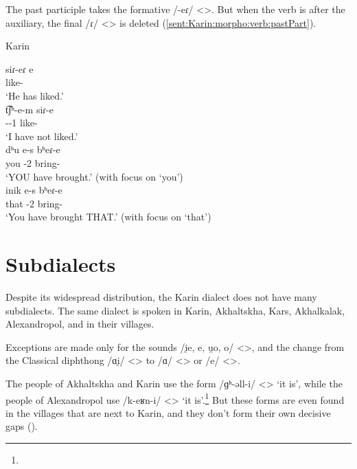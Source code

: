 The past participle takes the formative /-eɾ/ <>. But when the verb is after the auxiliary, the final /ɾ/ <> is deleted (\ref{sent:Karin:morpho:verb:pastPart}). 

\begin{exe}
	\ex Karin \label{sent:Karin:morpho:verb:pastPart}
	\begin{xlist}
		\ex \gll siɾ-eɾ e \\
		like-{\perfcvb} {\aux} \\
		\trans `He has liked.'\\
		\ex \gll t͡ʃʰ-e-m siɾ-e \\
		{\neggloss}-{\aux}-1{\sg} like-{\perfcvb} \\
		\trans `I have not liked.'\\
		\ex \gll dʰu e-s bʰeɾ-e \\
		you {\aux}-2{\sg} bring-{\perfcvb} \\
		\trans `YOU have brought.' (with focus on `you')\\
		\ex \gll inik e-s bʰeɾ-e \\
		that {\aux}-2{\sg} bring-{\perfcvb} \\
		\trans `You have brought THAT.' (with focus on `that')\\
	\end{xlist}
\end{exe}

\section{Subdialects}

Despite its widespread distribution, the Karin dialect does not have many subdialects. The same dialect is spoken in Karin, Akhaltskha, Kars, Akhalkalak, Alexandropol, and in their villages. 

Exceptions are made only for the sounds /i̯e, e, u̯o, o/ <>, and the change from the Classical diphthong /ɑi̯/ <> to /ɑ/ <> or /e/ <>. 

The people of Akhaltskha and Karin use the form /ɡʰ-əll-i/ <> `it is', while the people of Alexandropol use /k-eʁn-i/ <> `it is'.\footnote{} But these forms are even found in the villages that are next to Karin, and they don't form their own decisive gaps (). 

